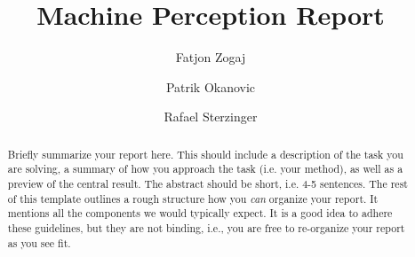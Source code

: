 \documentclass[sigconf]{acmart}
\begin{document}
\title{Machine Perception Report}

\author{Fatjon Zogaj}\affiliation{}

\author{Patrik Okanovic}\affiliation{}

\author{Rafael Sterzinger}\affiliation{}

\begin{abstract}
Briefly summarize your report here. This should include a description of the task you are solving, a summary of how you approach the task (i.e. your method), as well as a preview of the central result. The abstract should be short, i.e. 4-5 sentences. The rest of this template outlines a rough structure how you \emph{can} organize your report. It mentions all the components we would typically expect. It is a good idea to adhere these guidelines, but they are not binding, i.e., you are free to re-organize your report as you see fit.
\end{abstract}

\maketitle





\end{document}

